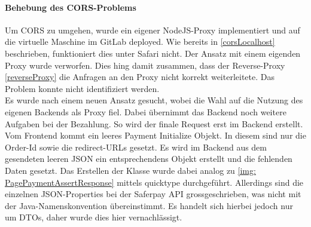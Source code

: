 \paragraph{Behebung des CORS-Problems}
Um CORS zu umgehen, wurde ein eigener NodeJS-Proxy implementiert und auf die virtuelle Maschine im GitLab deployed. Wie bereits in \ref{corsLocalhost} beschrieben, funktioniert dies unter Safari nicht. Der Ansatz mit einem eigenden Proxy wurde verworfen. Dies hing damit zusammen, dass der Reverse-Proxy \ref{reverseProxy} die Anfragen an den Proxy nicht korrekt weiterleitete. Das Problem konnte nicht identifiziert werden. \\ Es wurde nach einem neuen Ansatz gesucht, wobei die Wahl auf die Nutzung des eigenen Backends als Proxy fiel. Dabei übernimmt das Backend noch weitere Aufgaben bei der Bezahlung. So wird der finale Request erst im Backend erstellt. Vom Frontend kommt ein leeres Payment Initialize Objekt. In diesem sind nur die Order-Id sowie die redirect-URLs gesetzt. Es wird im Backend aus dem gesendeten leeren JSON ein entsprechendens Objekt erstellt und die fehlenden Daten gesetzt. Das Erstellen der Klasse wurde dabei analog zu \ref{img: PagePaymentAssertResponse} mittels quicktype durchgeführt. Allerdings sind die einzelnen JSON-Properties bei der Saferpay API grossgeschrieben, was nicht mit der Java-Namenskonvention übereinstimmt. Es handelt sich hierbei jedoch nur um DTOs, daher wurde dies hier vernachlässigt. 
